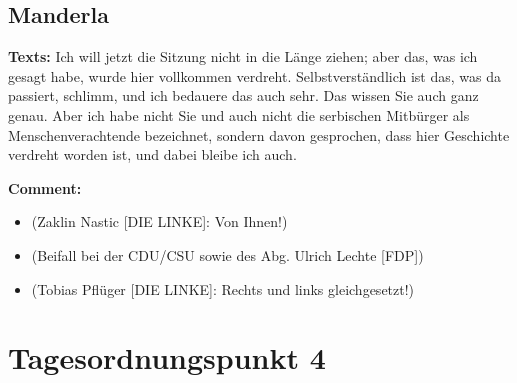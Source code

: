 \documentclass{article}
\begin{document}
\subsection{Manderla}
\noindent\textbf{Texts:} Ich will jetzt die Sitzung nicht in die Länge ziehen; aber das, was ich gesagt habe, wurde hier vollkommen verdreht. Selbstverständlich ist das, was da passiert, schlimm, und ich bedauere das auch sehr. Das wissen Sie auch ganz genau. Aber ich habe nicht Sie und auch nicht die serbischen Mitbürger als Menschenverachtende bezeichnet,  sondern davon gesprochen, dass hier Geschichte verdreht worden ist,  und dabei bleibe ich auch. 

\noindent\textbf{Comment:}
\begin{itemize}
    \setlength\itemsep{-3pt}
    \item (Zaklin Nastic [DIE LINKE]: Von Ihnen!)
    \setlength\itemsep{-3pt}
    \item (Beifall bei der CDU/CSU sowie des Abg. Ulrich Lechte [FDP])
    \setlength\itemsep{-3pt}
    \item (Tobias Pflüger [DIE LINKE]: Rechts und links gleichgesetzt!)
\end{itemize}
\section{Tagesordnungspunkt 4}
\end{document}
